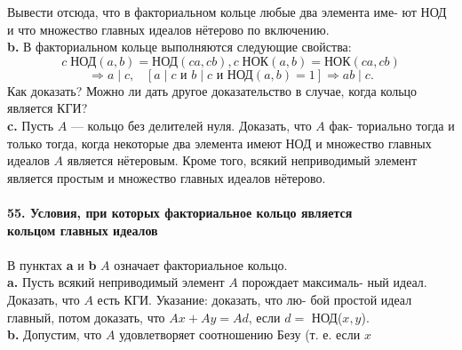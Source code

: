 \documentclass{mai_book}
\begin{document}
\noindent Вывести отсюда, что в факториальном кольце любые два элемента име-\linebreak
ют НОД и что множество главных идеалов нётерово по включению.\\
\hspace*{10pt}\textbf{b.}  В факториальном кольце выполняются следующие свойства:
\begin{equation*}
c\;\text{НОД}(a,b)=\text{НОД}(ca, cb), c\;\text{НОК}(a,b)=\text{НОК}(ca, cb)
\end{equation*}
\begin{equation*}
[a\;|\;bc \text{ и НОД}(a,b)=1]\Rightarrow a\;|\;c,\;\;\;[a\;|\;c \text{ и }b\;|\;c \text{ и НОД}(a,b)=1]\Rightarrow ab\;|\;c.
\end{equation*}
\noindent 
Как доказать? Можно ли дать другое доказательство в случае, когда\linebreak
кольцо является КГИ?
\\
\hspace*{10pt}\textbf{c.} Пусть $A$ — кольцо без делителей нуля. Доказать, что $A$ фак-\linebreak
ториально тогда и только тогда, когда некоторые два элемента имеют\linebreak
НОД и множество главных идеалов $A$ является нётеровым. Кроме того,\linebreak
всякий неприводимый элемент является простым и множество главных\linebreak
идеалов нётерово.
\\
\\
\noindent\textbf{55. Условия, при которых факториальное кольцо является\\
кольцом главных идеалов}\\\\
\hspace*{10pt} В пунктах \textbf{a} и \textbf{b} $A$ означает факториальное кольцо.\\
\hspace*{10pt}\textbf{a.} Пусть всякий неприводимый элемент $A$ порождает максималь-\linebreak
ный идеал. Доказать, что $A$ есть КГИ. Указание: доказать, что лю-\linebreak
бой простой идеал главный, потом доказать, что $Ax+Ay=Ad$, если\linebreak
$d=$ НОД($x,y$).
\\
\hspace*{10pt}\textbf{b.} Допустим, что $A$ удовлетворяет соотношению Безу (т. е. если $x$\linebreak
\end{document}
